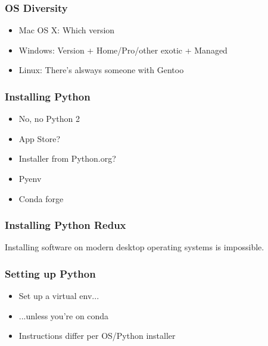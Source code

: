 \begin{frame}
\frametitle{OS Diversity}

\begin{itemize}
\item Mac OS X: Which version
\item Windows: Version + Home/Pro/other exotic + Managed
\item Linux: There's alsways someone with Gentoo
\end{itemize}

\end{frame}

\begin{frame}
\frametitle{Installing Python}

\begin{itemize}
\item No, no Python 2
\item App Store?
\item Installer from Python.org?
\item Pyenv
\item Conda forge
\end{itemize}

\end{frame}

\begin{frame}
\frametitle{Installing Python Redux}

Installing software on modern desktop operating systems is impossible.

\end{frame}

\begin{frame}
\frametitle{Setting up Python}

\begin{itemize}
\item Set up a virtual env...
\item ...unless you're on conda
\item Instructions differ per OS/Python installer
\end{itemize}

\end{frame}

